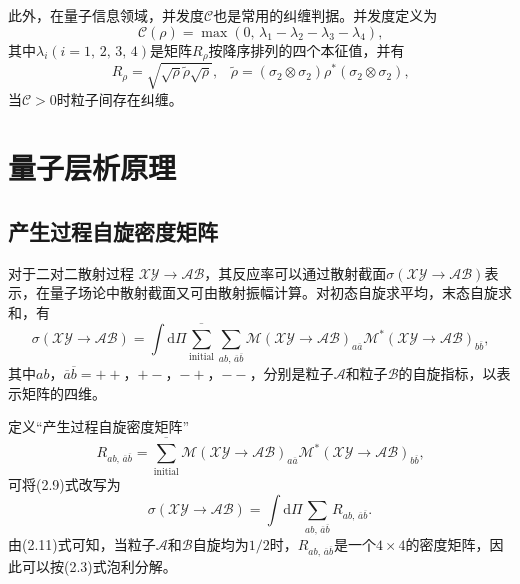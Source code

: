 此外，在量子信息领域，并发度$\mathcal{C}$\cite{ref17}也是常用的纠缠判据。并发度定义为
\begin{equation*}
\mathcal{C}(\rho)=\max(0\text{, } \lambda_1- \lambda_2- \lambda_3- \lambda_4)\text{,}
\tag{2.7}
\end{equation*}
\noindent 其中$\lambda_i(i=1\text{, }2\text{, }3\text{, }4)$是矩阵$R_{\rho}$按降序排列的四个本征值，并有
\begin{equation*}
R_{\rho}=\sqrt{\sqrt{\rho}\tilde{\rho}\sqrt{\rho}}\text{,} \quad \tilde{\rho}=(\sigma_2\otimes\sigma_2)\rho^{\ast}(\sigma_2\otimes\sigma_2)\text{,}
\tag{2.8}
\end{equation*}
\noindent 当$\mathcal{C}>0$时粒子间存在纠缠。

\section{量子层析原理}
\label{sec:twoptwo}

\subsection{产生过程自旋密度矩阵}
\label{sec:twoptwopone}

对于二对二散射过程 $\mathcal{X} \mathcal{Y} \rightarrow  \mathcal{A} \mathcal{B} $，其反应率可以通过散射截面$\sigma ( \mathcal{X} \mathcal{Y} \rightarrow \mathcal{A} \mathcal{B} )$表示，在量子场论中散射截面又可由散射振幅计算。对初态自旋求平均，末态自旋求和，有
\begin{equation*}
\sigma( \mathcal{X} \mathcal{Y}  \rightarrow  \mathcal{A} \mathcal{B} )=\int \text{d}\Pi \overline{\sum_{\text{initial}}} \sum_{ab\text{, } \overline{a} \overline{b}} \mathcal{M}( \mathcal{X} \mathcal{Y}  \rightarrow  \mathcal{A} \mathcal{B} )_{a\overline{a}} \mathcal{M}^{\ast}( \mathcal{X} \mathcal{Y}  \rightarrow  \mathcal{A} \mathcal{B} )_{b\overline{b}}\text{,}
\tag{2.9}
\end{equation*}
\noindent 其中$ab$，$ \overline{a} \overline{b}=++$，$+-$，$-+$，$--$，分别是粒子$\mathcal{A}$和粒子$\mathcal{B}$的自旋指标，以表示矩阵的四维。

定义“产生过程自旋密度矩阵”
\begin{equation*}
R_{ab\text{, }\overline{a} \overline{b} }=\overline{\sum_{\text{initial}}} \mathcal{M}( \mathcal{X} \mathcal{Y}  \rightarrow  \mathcal{A} \mathcal{B} )_{a\overline{a}} \mathcal{M}^{\ast}( \mathcal{X} \mathcal{Y}  \rightarrow  \mathcal{A} \mathcal{B} )_{b\overline{b}}\text{,}
\tag{2.10}
\end{equation*}
\noindent 可将(2.9)式改写为
\begin{equation*}
\sigma( \mathcal{X} \mathcal{Y}  \rightarrow  \mathcal{A} \mathcal{B} )=\int \text{d}\Pi \sum_{ab\text{, } \overline{a} \overline{b}} R_{ab\text{, }\overline{a} \overline{b} }\text{.}
\tag{2.11}
\end{equation*}
由(2.11)式可知，当粒子$\mathcal{A}$和$\mathcal{B}$自旋均为$1/2$时，$R_{ab\text{, } \overline{a} \overline{b} }$是一个$4\times 4$的密度矩阵，因此可以按(2.3)式泡利分解。

